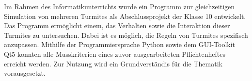 Im Rahmen des Informatikunterrichts wurde ein Programm zur gleichzeitigen Simulation von mehreren Turmites als Abschlussprojekt der Klasse 10 entwickelt. Das Programm ermöglicht einem, das Verhalten sowie die Interaktion dieser Turmites zu untersuchen. Dabei ist es möglich, die Regeln von Turmites spezifisch anzupassen. Mithilfe der Programmiersprache Python sowie dem GUI-Toolkit Qt5 \cite{qt5} konnten alle Musskriterien eines zuvor ausgearbeiteten Pflichtenheftes \cite{pflichtenheft} erreicht werden. Zur Nutzung wird ein Grundverständis für die Thematik vorausgesetzt.